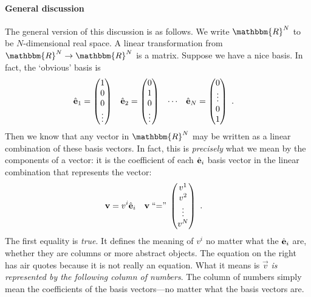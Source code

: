 \documentclass[12pt]{article}
\begin{document}
\paragraph{General discussion}
The general version of this discussion is as follows. We write $\mathbbm{R}^N$ to be $N$-dimensional real space. A linear transformation from $\mathbbm{R}^N \to \mathbbm{R}^N$ is a matrix. Suppose we have a nice basis. In fact, the `obvious' basis is
\begin{align}
    {\hat{\mathbf{e}}}_1 &= 
    \begin{pmatrix}
        1 \\ 0 \\ 0 \\ \vdots
    \end{pmatrix}
    &
    {\hat{\mathbf{e}}}_2 &= 
    \begin{pmatrix}
        0 \\ 1 \\ 0 \\ \vdots
    \end{pmatrix}
    &
    \cdots &
    &
    {\hat{\mathbf{e}}}_N &= 
    \begin{pmatrix}
        0 \\ \vdots \\ 0 \\ 1
    \end{pmatrix} \ .
\end{align}
Then we know that any vector in $\mathbbm{R}^N$ may be written as a linear combination of these basis vectors. In fact, this is \emph{precisely} what we mean by the components of a vector: it is the coefficient of each ${\hat{\mathbf{e}}}_i$ basis vector in the linear combination that represents the vector:
\begin{align}
    \mathbf{v} &= v^i{\hat{\mathbf{e}}}_i 
    &
    \mathbf{v} &\;\textnormal{``=''}\;
         \begin{pmatrix}
        v^1 \\ v^2 \\ \vdots \\ v^N
    \end{pmatrix} \ .
\end{align}
The first equality is \emph{true}. It defines the meaning of $v^i$ no matter what the ${\hat{\mathbf{e}}}_i$ are, whether they are columns or more abstract objects. The equation on the right has air quotes because it is not really an equation. What it means is $\vec{v}$ \emph{is represented by the following column of numbers}. The column of numbers simply mean the coefficients of the basis vectors---no matter what the basis vectors are.
\end{document}
